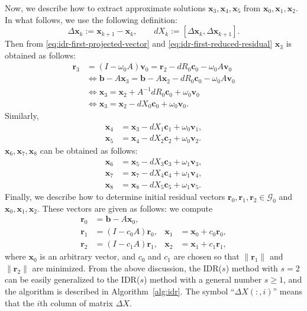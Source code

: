 {Now, we describe how to extract approximate solutions $\bm x_3,\bm x_4,\bm x_5$ from $\bm x_0,\bm x_1,\bm x_2$. In what follows, we use the following definition:}
\[\Delta\bm x_k:=\bm x_{k+1}-\bm x_k,\qquad dX_k:=[\Delta\bm x_k,\Delta\bm x_{k+1}].\]
{Then from \eqref{eq:idr-first-projected-vector} and \eqref{eq:idr-first-reduced-residual} $\bm x_3$ is obtained as follows:}
\[\begin{aligned}\bm r_3&=(I-\omega_0A)\bm v_0=\bm r_2-dR_0\bm c_0-\omega_0A\bm v_0\\&\Leftrightarrow\bm b-A\bm x_3=\bm b-A\bm x_2-dR_0\bm c_0-\omega_0A\bm v_0\\&\Leftrightarrow\bm x_3=\bm x_2+A^{-1}dR_0\bm c_0+\omega_0\bm v_0\\&\Leftrightarrow\bm x_3=\bm x_2-dX_0\bm c_0+\omega_0\bm v_0.\end{aligned}\]
{Similarly,}
\[\begin{aligned}\bm x_4&=\bm x_3-dX_1\bm c_1+\omega_0\bm v_1,\\\bm x_5&=\bm x_4-dX_2\bm c_2+\omega_0\bm v_2.\end{aligned}\]
{$\bm x_6,\bm x_7,\bm x_8$ can be obtained as follows:}
\[\begin{aligned}\bm x_6&=\bm x_5-dX_3\bm c_3+\omega_1\bm v_3,\\\bm x_7&=\bm x_7-dX_4\bm c_4+\omega_1\bm v_4,\\\bm x_8&=\bm x_8-dX_5\bm c_5+\omega_1\bm v_5.\end{aligned}\]
{Finally, we describe how to determine initial residual vectors $\bm r_0,\bm r_1,\bm r_2\in\mathcal G_0$ and $\bm x_0,\bm x_1,\bm x_2$. These vectors are given as follows: we compute}
\[\begin{aligned}\bm r_0&=\bm b-A\bm x_0,\\\bm r_1&=(I-c_0A)\bm r_0,&\bm x_1&=\bm x_0+c_0\bm r_0,\\\bm r_2&=(I-c_1A)\bm r_1,&\bm x_2&=\bm x_1+c_1\bm r_1,\end{aligned}\]
{where $\bm x_0$ is an arbitrary vector, and $c_0$ and $c_1$ are chosen so that $\|\bm r_1\|$ and $\|\bm r_2\|$ are minimized.}
{From the above discussion, the IDR($s$) method with $s=2$ can be easily generalized to the IDR($s$) method with a general number $s\ge1$, and the algorithm is described in Algorithm\ \ref{alg:idr}. The symbol ``$\Delta X(:,i)$'' means that the $i$th column of matrix $\Delta X$.}
